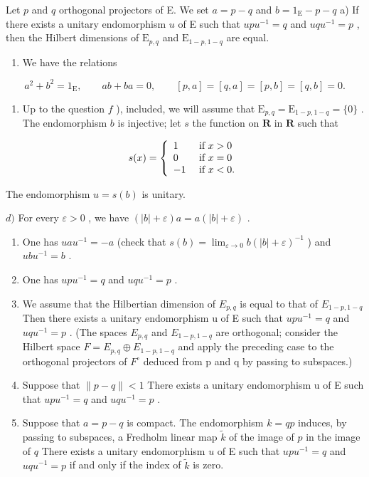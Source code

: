 Let \(p\) and \(q\) orthogonal projectors of E. We set \(a = p - q\) and \(b = 1_{\mathrm{E}} - p - q\) a) If there exists a unitary endomorphism \(u\) of E such that \(upu^{-1} = q\) and \(uqu^{-1} = p\) , then the Hilbert dimensions of \(\mathrm{E}_{p,q}\) and \(\mathrm{E}_{1 - p,1 - q}\) are equal.

\begin{enumerate}
\def\labelenumi{\alph{enumi})}
\setcounter{enumi}{1}
\tightlist
\item
  We have the relations
\end{enumerate}

\[
a ^ {2} + b ^ {2} = 1 _ {\mathrm{E}}, \qquad a b + b a = 0, \qquad [ p, a ] = [ q, a ] = [ p, b ] = [ q, b ] = 0.
\]

\begin{enumerate}
\def\labelenumi{\alph{enumi})}
\setcounter{enumi}{2}
\tightlist
\item
  Up to the question \(f\) ), included, we will assume that \(\mathrm{E}_{p,q} = \mathrm{E}_{1 - p,1 - q} = \{0\}\) . The endomorphism \(b\) is injective; let \(s\) the function on \(\mathbf{R}\) in \(\mathbf{R}\) such that
\end{enumerate}

\[
s (x) = \left\{ \begin{array}{l l} 1 & \text { if } x > 0 \\ 0 & \text { if } x = 0 \\ - 1 & \text { if } x <   0. \end{array} \right.
\]

The endomorphism \(u = s(b)\) is unitary.

\(d)\) For every \(\varepsilon > 0\) , we have \((|b| + \varepsilon)a = a(|b| + \varepsilon)\) .

\begin{enumerate}
\def\labelenumi{\alph{enumi})}
\setcounter{enumi}{4}
\item
  One has \(uau^{-1} = -a\) (check that \(s(b) = \lim_{\varepsilon \to 0} b(|b| + \varepsilon)^{-1}\) ) and \(ubu^{-1} = b\) .
\item
  One has \(upu^{-1} = q\) and \(uqu^{-1} = p\) .
\item
  We assume that the Hilbertian dimension of \(E_{p,q}\) is equal to that of \(E_{1-p,1-q}\) Then there exists a unitary endomorphism u of E such that \(upu^{-1} = q\) and \(uqu^{-1} = p\) . (The spaces \(E_{p,q}\) and \(E_{1-p,1-q}\) are orthogonal; consider the Hilbert space \(F = E_{p,q} \oplus E_{1-p,1-q}\) and apply the preceding case to the orthogonal projectors of \(F^{\circ}\) deduced from p and q by passing to subspaces.)
\item
  Suppose that \(\|p-q\|<1\) There exists a unitary endomorphism u of E such that \(upu^{-1}=q\) and \(uqu^{-1}=p\) .
\item
  Suppose that \(a = p - q\) is compact. The endomorphism \(k = qp\) induces, by passing to subspaces, a Fredholm linear map \(\widetilde{k}\) of the image of \(p\) in the image of \(q\) There exists a unitary endomorphism \(u\) of E such that \(upu^{-1} = q\) and \(uqu^{-1} = p\) if and only if the index of \(\widetilde{k}\) is zero.
\end{enumerate}

